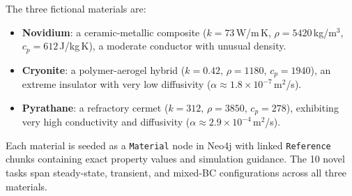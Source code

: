 \documentclass[twocolumn]{article}
\begin{document}
The three fictional materials are:
\begin{itemize}
  \item \textbf{Novidium}: a ceramic-metallic composite ($k{=}73$\,W/m\,K,
        $\rho{=}5420$\,kg/m$^3$, $c_p{=}612$\,J/kg\,K),
        a moderate conductor with unusual density.
  \item \textbf{Cryonite}: a polymer-aerogel hybrid ($k{=}0.42$,
        $\rho{=}1180$, $c_p{=}1940$), an extreme insulator with
        very low diffusivity ($\alpha \approx 1.8{\times}10^{-7}$\,m$^2$/s).
  \item \textbf{Pyrathane}: a refractory cermet ($k{=}312$,
        $\rho{=}3850$, $c_p{=}278$), exhibiting very high conductivity
        and diffusivity ($\alpha \approx 2.9{\times}10^{-4}$\,m$^2$/s).
\end{itemize}
Each material is seeded as a \texttt{Material} node in Neo4j with linked
\texttt{Reference} chunks containing exact property values and
simulation guidance.  The 10 novel tasks span steady-state, transient,
and mixed-BC configurations across all three materials.
\end{document}
